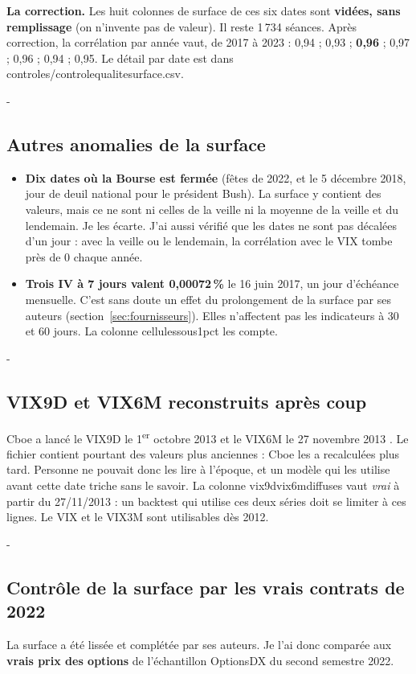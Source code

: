 \documentclass[10pt,a4paper]{article}
\makeatletter
\newcommand{\besoin}[1]{\par\penalty-100\begingroup\setlength{\dimen@}{#1}%
  \dimen@ii\pagegoal\advance\dimen@ii-\pagetotal
  \ifdim\dimen@>\dimen@ii\ifdim\dimen@ii>\z@\vfil\fi\break\fi\endgroup}
\let\soussectionorigine\subsection
\renewcommand{\subsection}{\besoin{5\baselineskip}\soussectionorigine}
\newcommand{\coupure}{\textunderscore\allowbreak}
\newcommand{\fic}[1]{{\small\ttfamily\let\_\coupure #1}}
\makeatother
\begin{document}
\textbf{La correction.} Les huit colonnes de surface de ces six dates sont \textbf{vidées, sans remplissage} (on n'invente pas de valeur). Il reste 1\,734 séances. Après correction, la corrélation par année vaut, de 2017 à 2023 : 0,94 ; 0,93 ; \textbf{0,96} ; 0,97 ; 0,96 ; 0,94 ; 0,95. Le détail par date est dans \fic{controles/controle\_qualite\_surface.csv}.

\subsection{Autres anomalies de la surface}
\begin{itemize}
\item \textbf{Dix dates où la Bourse est fermée} (fêtes de 2022, et le 5 décembre 2018, jour de deuil national pour le président Bush). La surface y contient des valeurs, mais ce ne sont ni celles de la veille ni la moyenne de la veille et du lendemain. Je les écarte. J'ai aussi vérifié que les dates ne sont pas décalées d'un jour : avec la veille ou le lendemain, la corrélation avec le VIX tombe près de 0 chaque année.
\item \textbf{Trois IV à 7 jours valent 0,00072\,\%} le 16 juin 2017, un jour d'échéance mensuelle. C'est sans doute un effet du prolongement de la surface par ses auteurs (section~\ref{sec:fournisseurs}). Elles n'affectent pas les indicateurs à 30 et 60 jours. La colonne \fic{cellules\_sous\_1pct} les compte.
\end{itemize}

\subsection{VIX9D et VIX6M reconstruits après coup}
Cboe a lancé le VIX9D le 1\textsuperscript{er} octobre 2013 et le VIX6M le 27 novembre 2013 \cite{cboe9d,cboe6m}. Le fichier contient pourtant des valeurs plus anciennes : Cboe les a recalculées plus tard. Personne ne pouvait donc les lire à l'époque, et un modèle qui les utilise avant cette date triche sans le savoir. La colonne \fic{vix9d\_vix6m\_diffuses} vaut \emph{vrai} à partir du 27/11/2013 : un backtest qui utilise ces deux séries doit se limiter à ces lignes. Le VIX et le VIX3M sont utilisables dès 2012.

\subsection{Contrôle de la surface par les vrais contrats de 2022}
La surface a été lissée et complétée par ses auteurs. Je l'ai donc comparée aux \textbf{vrais prix des options} de l'échantillon OptionsDX du second semestre 2022.
\end{document}
